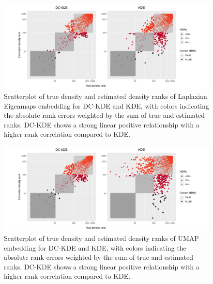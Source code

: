 \documentclass[12pt]{article}
\begin{document}
\begin{figure}

{\centering \includegraphics[width=1\linewidth]{figures/Twin Peak2000_densityrank_comparison_le_radius8_r0_5_logrank_rec_colprob_smallblocks3_crossfalse} 

}

\caption{Scatterplot of true density and estimated density ranks of Laplaxian Eigenmaps embedding for DC-KDE and KDE, with colors indicating the absolute rank errors weighted by the sum of true and estimated ranks. DC-KDE shows a strong linear positive relationship with a higher rank correlation compared to KDE.}\label{fig:tpleden}
\end{figure}

\begin{figure}

{\centering \includegraphics[width=1\linewidth]{figures/Twin Peak2000_densityrank_comparison_umap_radius8_r0_5_logrank_rec_colprob_smallblocks3_crossfalse} 

}

\caption{Scatterplot of true density and estimated density ranks of UMAP embedding for DC-KDE and KDE, with colors indicating the absolute rank errors weighted by the sum of true and estimated ranks. DC-KDE shows a strong linear positive relationship with a higher rank correlation compared to KDE.}\label{fig:tpumapden}
\end{figure}
\end{document}
